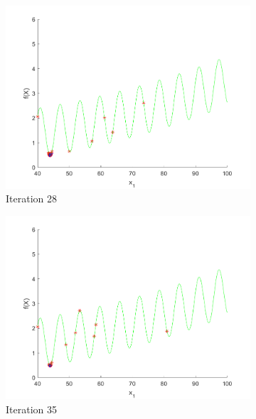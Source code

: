 \begin{figure}
\begin{subfigure}[b]{0.4\textwidth}
   \includegraphics[width=\textwidth]{img/smpl/grwnk1dshft/loa-iter-28}
   \caption{Iteration 28}
   \label{fig:s3-iter-4}
 \end{subfigure}
 \begin{subfigure}[b]{0.4\textwidth}
   \includegraphics[width=\textwidth]{img/smpl/grwnk1dshft/loa-iter-35}
   \caption{Iteration 35}
   \label{fig:s3-iter-5}
 \end{subfigure}
 \begin{subfigure}[b]{0.4\textwidth}

\end{subfigure}
\end{figure}
